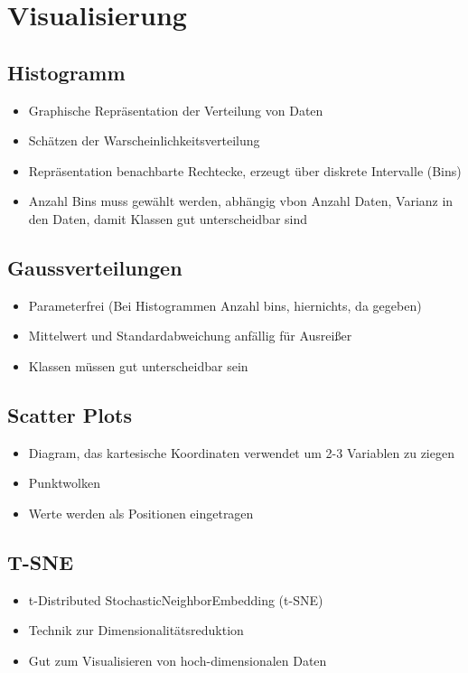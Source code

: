 \documentclass[a4paper,10pt,oneside]{article}
\begin{document}
\section{Visualisierung}

\subsection{Histogramm}
\begin{itemize}
	\item Graphische Repräsentation der Verteilung von Daten
	\item Schätzen der Warscheinlichkeitsverteilung
	\item Repräsentation benachbarte Rechtecke, erzeugt über diskrete Intervalle (Bins)
	\item Anzahl Bins muss gewählt werden, abhängig vbon Anzahl Daten, Varianz in den Daten, damit Klassen gut unterscheidbar sind
\end{itemize}

\subsection{Gaussverteilungen}
\begin{itemize}
	\item Parameterfrei (Bei Histogrammen Anzahl bins, hiernichts, da gegeben)
	\item Mittelwert und Standardabweichung anfällig für Ausreißer
	\item Klassen müssen gut unterscheidbar sein
\end{itemize}


\subsection{Scatter Plots}
\begin{itemize}
	\item Diagram, das kartesische Koordinaten verwendet um 2-3 Variablen zu ziegen
	\item Punktwolken
	\item Werte werden als Positionen eingetragen 
\end{itemize}


\subsection{T-SNE}
\begin{itemize}
	\item t-Distributed StochasticNeighborEmbedding (t-SNE)
	\item Technik zur Dimensionalitätsreduktion
	\item Gut zum Visualisieren von hoch-dimensionalen Daten
\end{itemize}
\end{document}
